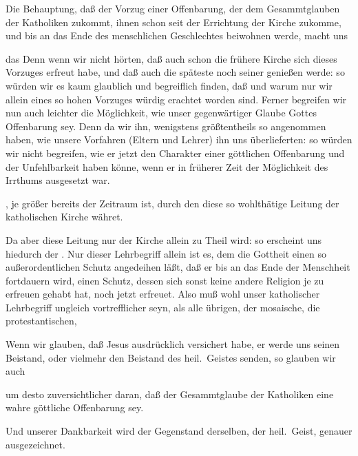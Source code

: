 Die Behauptung, daß der Vorzug einer Offenbarung, der dem Gesammtglauben der Katholiken zukommt, ihnen schon seit der Errichtung der Kirche zukomme, und bis an das Ende des menschlichen Geschlechtes beiwohnen werde, macht uns
\begin{aufza}
\item das  Denn wenn wir nicht hörten, daß auch schon die frühere Kirche sich dieses Vorzuges erfreut habe, und daß auch die späteste noch seiner genießen werde: so würden wir es kaum glaublich und begreiflich finden, daß und warum nur wir allein eines so hohen Vorzuges würdig erachtet worden sind. Ferner begreifen wir nun auch leichter die Möglichkeit, wie unser gegenwärtiger Glaube Gottes Offenbarung sey. Denn da wir ihn, wenigstens größtentheils so angenommen haben, wie unsere Vorfahren (Eltern und Lehrer) ihn uns überlieferten: so würden wir nicht begreifen, wie er jetzt den Charakter einer göttlichen Offenbarung und der Unfehlbarkeit haben könne, wenn er in früherer Zeit der Möglichkeit des Irrthums ausgesetzt war.
\item {}, je größer bereits der Zeitraum ist, durch den diese so wohlthätige Leitung der katholischen Kirche währet.
\item Da aber diese Leitung nur der  Kirche allein zu Theil wird: so erscheint uns hiedurch der . Nur dieser Lehrbegriff allein ist es, dem die Gottheit einen so außerordentlichen Schutz angedeihen läßt, daß er bis an das Ende der Menschheit fortdauern wird, einen Schutz, dessen sich sonst keine andere Religion je zu erfreuen gehabt hat, noch jetzt erfreuet. Also muß wohl unser katholischer Lehrbegriff ungleich vortrefflicher seyn, als alle übrigen, der mosaische, die protestantischen, \uma~
\end{aufza}

Wenn wir glauben, daß Jesus ausdrücklich versichert habe, er werde uns seinen Beistand, oder vielmehr den Beistand des heil.\ Geistes senden, so glauben wir auch
\begin{aufza}
\item um desto zuversichtlicher daran, daß der Gesammtglaube der Katholiken eine wahre göttliche Offenbarung sey.
\item Und unserer Dankbarkeit wird der Gegenstand derselben, der heil.\ Geist, genauer ausgezeichnet.
\end{aufza}

